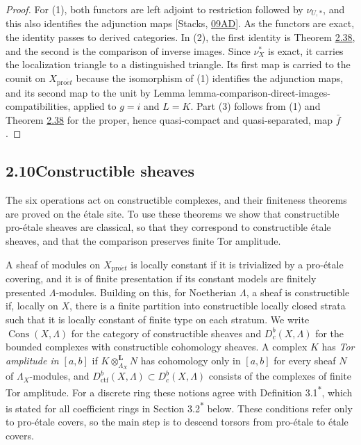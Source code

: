 \documentclass[11pt]{article}
\newcommand{\bpout}[1]{#1\textsuperscript{\hyperlink{bp-outside}{\ensuremath{\ast}}}}
\providecommand{\Cons}{}\renewcommand{\Cons}{\operatorname{Cons}}
\providecommand{\Dbc}{}\renewcommand{\Dbc}{D^b_c}
\begin{document}
\begin{proof}[{Proof}]\label{bp118}%
For (1), both functors are left adjoint to restriction followed by \(\nu_{U,*}\), and this also identifies the adjunction maps [Stacks, \href{https://stacks.math.columbia.edu/tag/09AD}{09AD}]. As the functors are exact, the identity passes to derived categories. In (2), the first identity is Theorem \hyperref[bp111]{2.38}, and the second is the comparison of inverse images. Since \(\nu_X^*\) is exact, it carries the localization triangle to a distinguished triangle. Its first map is carried to the counit on \(X_{\mathrm{pro}\acute{e}t}\) because the isomorphism of (1) identifies the adjunction maps, and its second map to the unit by Lemma lemma-comparison-direct-images-compatibilities, applied to \(g=i\) and \(L=K\). Part (3) follows from (1) and Theorem \hyperref[bp111]{2.38} for the proper, hence quasi-compact and quasi-separated, map \(\bar f\).
\end{proof}


\subsection*{\texorpdfstring{2.10\quad Constructible sheaves}{2.10 Constructible sheaves}}
\label{bp119}%
\label{bp120}%
The six operations act on constructible complexes, and their finiteness theorems are proved on the étale site. To use these theorems we show that constructible pro-étale sheaves are classical, so that they correspond to constructible étale sheaves, and that the comparison preserves finite Tor amplitude.

A sheaf of modules on \(X_{\mathrm{pro}\acute{e}t}\) is locally constant if it is trivialized by a pro-étale covering, and it is of finite presentation if its constant models are finitely presented \(\Lambda\)-modules. Building on this, for Noetherian \(\Lambda\), a sheaf is constructible if, locally on \(X\), there is a finite partition into constructible locally closed strata such that it is locally constant of finite type on each stratum. We write \(\Cons(X,\Lambda)\) for the category of constructible sheaves and \(\Dbc(X,\Lambda)\) for the bounded complexes with constructible cohomology sheaves. A complex \(K\) has \emph{Tor amplitude in \([a,b]\)} if \(K\otimes^{\mathbf L}_{\Lambda_X}N\) has cohomology only in \([a,b]\) for every sheaf \(N\) of \(\Lambda_X\)-modules, and \(D^b_{\mathrm{ctf}}(X,\Lambda)\subset\Dbc(X,\Lambda)\) consists of the complexes of finite Tor amplitude. For a discrete ring these notions agree with Definition \bpout{3.1}, which is stated for all coefficient rings in Section \bpout{3.2} below. These conditions refer only to pro-étale covers, so the main step is to descend torsors from pro-étale to étale covers.
\end{document}
